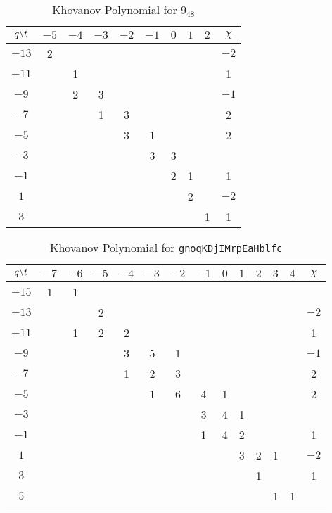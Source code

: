\documentclass{article}
\theoremstyle{plain}
\begin{document}
        \begin{table}
            \centering
            \begin{tabular}{| c | c | c | c | c | c | c | c | c | c |}
                \hline
                $q\symbol{92}t$&$-5$&$-4$&$-3$&$-2$&$-1$&$0$&$1$&$2$&$\chi$\\
                \hline
                $-13$&2&&&&&&&&$-2$\\
                \hline
                $-11$&&1&&&&&&&1\\
                \hline
                $-9$&&2&3&&&&&&$-1$\\
                \hline
                $-7$&&&1&3&&&&&2\\
                \hline
                $-5$&&&&3&1&&&&2\\
                \hline
                $-3$&&&&&3&3&&&\\
                \hline
                $-1$&&&&&&2&1&&1\\
                \hline
                $1$&&&&&&&2&&$-2$\\
                \hline
                $3$&&&&&&&&1&1\\
                \hline
            \end{tabular}
            \caption{Khovanov Polynomial for $9_{48}$}
        \end{table}
        \begin{table}
            \centering
            \begin{tabular}{| c | c |c | c | c | c | c | c | c | c | c | c | c | c |}
                \hline
                $q\symbol{92}t$&$-7$&$-6$&$-5$&$-4$&$-3$&$-2$&$-1$&$0$&$1$&$2$&$3$&$4$&$\chi$\\
                \hline
                $-15$&1&1&&&&&&&&&&&\\
                \hline
                $-13$&&&2&&&&&&&&&&$-2$\\
                \hline
                $-11$&&1&2&2&&&&&&&&&1\\
                \hline
                $-9$&&&&3&5&1&&&&&&&$-1$\\
                \hline
                $-7$&&&&1&2&3&&&&&&&2\\
                \hline
                $-5$&&&&&1&6&4&1&&&&&2\\
                \hline
                $-3$&&&&&&&3&4&1&&&&\\
                \hline
                $-1$&&&&&&&1&4&2&&&&1\\
                \hline
                $1$&&&&&&&&&3&2&1&&$-2$\\
                \hline
                $3$&&&&&&&&&&1&&&1\\
                \hline
                $5$&&&&&&&&&&&1&1&\\
                \hline
            \end{tabular}
            \caption{Khovanov Polynomial for \texttt{gnoqKDjIMrpEaHblfc}}
        \end{table}
\end{document}
